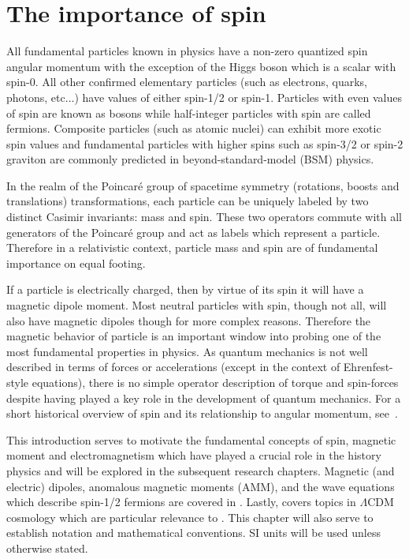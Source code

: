 \chapter{The importance of spin}
\label{chap:intro}
\noindent All fundamental particles known in physics have a non-zero quantized spin angular momentum with the exception of the Higgs boson which is a scalar with spin-0. All other confirmed elementary particles (such as electrons, quarks, photons, etc...) have values of either spin-1/2 or spin-1. Particles with even values of spin are known as bosons while half-integer particles with spin are called fermions. Composite particles (such as atomic nuclei) can exhibit more exotic spin values and fundamental particles with higher spins such as spin-3/2 or spin-2 graviton are commonly predicted in beyond-standard-model (BSM) physics.

In the realm of the Poincar{\'e} group of spacetime symmetry (rotations, boosts and translations) transformations, each particle can be uniquely labeled by two distinct Casimir invariants: mass and spin. These two operators commute with all generators of the Poincar{\'e} group and act as labels which represent a particle. Therefore in a relativistic context, particle mass and spin are of fundamental importance on equal footing.

If a particle is electrically charged, then by virtue of its spin it will have a magnetic dipole moment. Most neutral particles with spin, though not all, will also have magnetic dipoles though for more complex reasons. Therefore the magnetic behavior of particle is an important window into probing one of the most fundamental properties in physics. As quantum mechanics is not well described in terms of forces or accelerations (except in the context of Ehrenfest-style equations), there is no simple operator description of torque and spin-forces despite having played a key role in the development of quantum mechanics. For a short historical overview of spin and its relationship to angular momentum, see~\cite{Ohanian:1986wg}.

This introduction serves to motivate the fundamental concepts of spin, magnetic moment and electromagnetism which have played a crucial role in the history physics and will be explored in the subsequent research chapters. Magnetic (and electric) dipoles, anomalous magnetic moments (AMM), and the wave equations which describe spin-1/2 fermions are covered in . Lastly,  covers topics in $\Lambda\mathrm{CDM}$ cosmology which are particular relevance to . This chapter will also serve to establish notation and mathematical conventions. SI units will be used unless otherwise stated.

